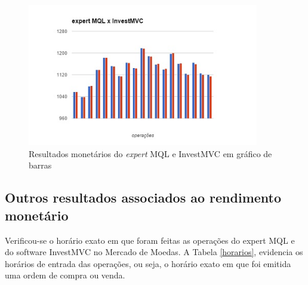 \begin{figure}[H]
\centering
\includegraphics[width=0.9\textwidth]{figuras/graficoBarras}
\caption{Resultados monetários do \textit{expert} MQL e InvestMVC em gráfico de barras}
\label{graficoBarras}
\end{figure}

\subsection{Outros resultados associados ao rendimento monetário}

Verificou-se o horário exato em que foram feitas as operações do expert MQL e do software InvestMVC no Mercado de Moedas. A Tabela \ref{horarios}, evidencia os horários de entrada das operações, ou seja, o horário exato em que foi emitida uma ordem de compra ou venda.


